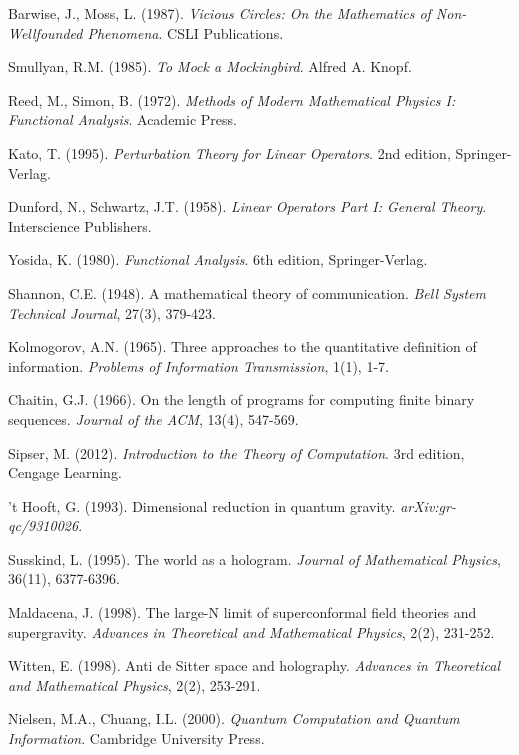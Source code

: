 \documentclass[12pt]{article}
\theoremstyle{plain}
\theoremstyle{definition}
\begin{document}
\begin{thebibliography}{99}
 Barwise, J., Moss, L. (1987). \emph{Vicious Circles: On the Mathematics of Non-Wellfounded Phenomena}. CSLI Publications.

 Smullyan, R.M. (1985). \emph{To Mock a Mockingbird}. Alfred A. Knopf.

 Reed, M., Simon, B. (1972). \emph{Methods of Modern Mathematical Physics I: Functional Analysis}. Academic Press.

 Kato, T. (1995). \emph{Perturbation Theory for Linear Operators}. 2nd edition, Springer-Verlag.

 Dunford, N., Schwartz, J.T. (1958). \emph{Linear Operators Part I: General Theory}. Interscience Publishers.

 Yosida, K. (1980). \emph{Functional Analysis}. 6th edition, Springer-Verlag.

 Shannon, C.E. (1948). A mathematical theory of communication. \emph{Bell System Technical Journal}, 27(3), 379-423.

 Kolmogorov, A.N. (1965). Three approaches to the quantitative definition of information. \emph{Problems of Information Transmission}, 1(1), 1-7.

 Chaitin, G.J. (1966). On the length of programs for computing finite binary sequences. \emph{Journal of the ACM}, 13(4), 547-569.

 Sipser, M. (2012). \emph{Introduction to the Theory of Computation}. 3rd edition, Cengage Learning.

 't Hooft, G. (1993). Dimensional reduction in quantum gravity. \emph{arXiv:gr-qc/9310026}.

 Susskind, L. (1995). The world as a hologram. \emph{Journal of Mathematical Physics}, 36(11), 6377-6396.

 Maldacena, J. (1998). The large-N limit of superconformal field theories and supergravity. \emph{Advances in Theoretical and Mathematical Physics}, 2(2), 231-252.

 Witten, E. (1998). Anti de Sitter space and holography. \emph{Advances in Theoretical and Mathematical Physics}, 2(2), 253-291.

 Nielsen, M.A., Chuang, I.L. (2000). \emph{Quantum Computation and Quantum Information}. Cambridge University Press.


\end{thebibliography}
\end{document}
